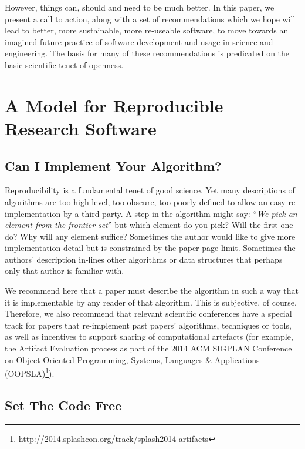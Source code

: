 \documentclass[10pt,conference,final]{IEEEtran}
\begin{document}
However, things can, should and need to be much better. In this paper,
we present a call to action, along with a set of recommendations which
we hope will lead to better, more sustainable, more re-useable
software, to move towards an imagined future practice of software
development and usage in science and engineering.  The basis for many
of these recommendations is predicated on the basic scientific tenet
of openness.

\section{A Model for Reproducible Research Software}

\subsection{Can I Implement Your Algorithm?}

Reproducibility is a fundamental tenet of good science. Yet many
descriptions of algorithms are too high-level, too obscure, too
poorly-defined to allow an easy re-implementation by a third party. A
step in the algorithm might say: ``{\emph{We pick an element from the
frontier set}}'' but which element do you pick? Will the first one do?
Why will any element suffice? Sometimes the author would like to give
more implementation detail but is constrained by the paper page
limit. Sometimes the authors' description in-lines other algorithms or
data structures that perhaps only that author is familiar with.

 We recommend here
that a paper must describe the algorithm in such a way that it is
implementable by any reader of that algorithm. This is subjective, of
course. Therefore, we also recommend that relevant scientific
conferences have a special track for papers that re-implement past
papers' algorithms, techniques or tools, as well as incentives to
support sharing of computational artefacts (for example, the Artifact
Evaluation process as part of the 2014 ACM SIGPLAN Conference on
Object-Oriented Programming, Systems, Languages \&
Applications (OOPSLA)\footnote{\url{http://2014.splashcon.org/track/splash2014-artifacts}}).


\subsection{Set The Code Free} 
\end{document}
